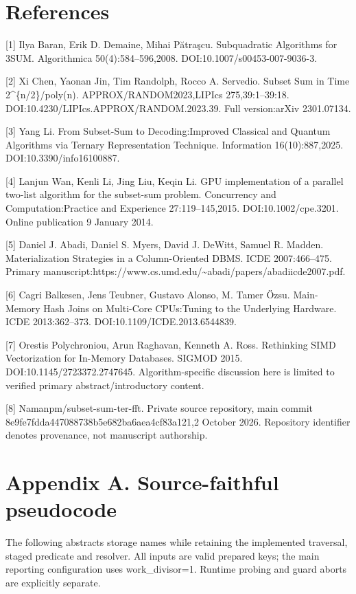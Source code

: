 \documentclass[10pt,letterpaper]{article}
\begin{document}
\section*{References}

[1] Ilya Baran, Erik D. Demaine, Mihai Pătraşcu. Subquadratic Algorithms for 3SUM. Algorithmica 50(4):584--596,2008. DOI:10.1007/s00453-007-9036-3.


[2] Xi Chen, Yaonan Jin, Tim Randolph, Rocco A. Servedio. Subset Sum in Time 2\textasciicircum{}\{n/2\}/poly(n). APPROX/RANDOM2023,LIPIcs 275,39:1--39:18. DOI:10.4230/LIPIcs.APPROX/RANDOM.2023.39. Full version:arXiv 2301.07134.


[3] Yang Li. From Subset-Sum to Decoding:Improved Classical and Quantum Algorithms via Ternary Representation Technique. Information 16(10):887,2025. DOI:10.3390/info16100887.


[4] Lanjun Wan, Kenli Li, Jing Liu, Keqin Li. GPU implementation of a parallel two-list algorithm for the subset-sum problem. Concurrency and Computation:Practice and Experience 27:119--145,2015. DOI:10.1002/cpe.3201. Online publication 9 January 2014.


[5] Daniel J. Abadi, Daniel S. Myers, David J. DeWitt, Samuel R. Madden. Materialization Strategies in a Column-Oriented DBMS. ICDE 2007:466--475. Primary manuscript:https://www.cs.umd.edu/\textasciitilde{}abadi/papers/abadiicde2007.pdf.


[6] Cagri Balkesen, Jens Teubner, Gustavo Alonso, M. Tamer Özsu. Main-Memory Hash Joins on Multi-Core CPUs:Tuning to the Underlying Hardware. ICDE 2013:362--373. DOI:10.1109/ICDE.2013.6544839.


[7] Orestis Polychroniou, Arun Raghavan, Kenneth A. Ross. Rethinking SIMD Vectorization for In-Memory Databases. SIGMOD 2015. DOI:10.1145/2723372.2747645. Algorithm-specific discussion here is limited to verified primary abstract/introductory content.


[8] Namanpm/subset-sum-ter-fft. Private source repository, main commit 8e9fe7fdda447088738b5e682ba6aea4cf83a121,2 October 2026. Repository identifier denotes provenance, not manuscript authorship.


\section*{Appendix A. Source-faithful pseudocode}

The following abstracts storage names while retaining the implemented traversal, staged predicate and resolver. All inputs are valid prepared keys; the main reporting configuration uses work\_divisor=1. Runtime probing and guard aborts are explicitly separate.
\end{document}
